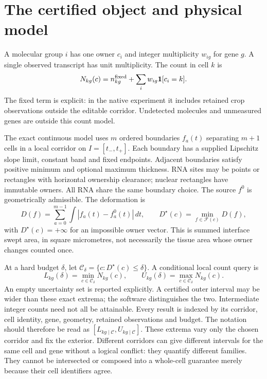 \documentclass[10pt,letterpaper]{article}
\newcommand{\F}{\mathcal F}
\newcommand{\C}{\mathcal C}
\newcommand{\D}{D^\star}
\newcommand{\ind}{\mathbf 1}
\begin{document}
\section{The certified object and physical model}
A molecular group \(i\) has one owner \(c_i\) and integer multiplicity \(w_{ig}\) for gene \(g\). A single observed transcript has unit multiplicity. The count in cell \(k\) is
\begin{equation}
 N_{kg}(c)=n^{\rm fixed}_{kg}+\sum_i w_{ig}\ind[c_i=k].\label{eq:count}
\end{equation}
The fixed term is explicit: in the native experiment it includes retained crop observations outside the editable corridor. Undetected molecules and unmeasured genes are outside this count model.

The exact continuous model uses \(m\) ordered boundaries \(f_a(t)\) separating \(m+1\) cells in a local corridor on $I=[t_-,t_+]$. Each boundary has a supplied Lipschitz slope limit, constant band and fixed endpoints. Adjacent boundaries satisfy positive minimum and optional maximum thickness. RNA sites may be points or rectangles with horizontal ownership clearance; nuclear rectangles have immutable owners. All RNA share the same boundary choice. The source \(f^0\) is geometrically admissible. The deformation is
\begin{equation}
 D(f)=\sum_{a=0}^{m-1}\int |f_a(t)-f^0_a(t)|\,dt,
 \qquad \D(c)=\min_{f\in\F(c)}D(f),\label{eq:area}
\end{equation}
with \(\D(c)=+\infty\) for an impossible owner vector. This is summed interface swept area, in square micrometres, not necessarily the tissue area whose owner changes counted once.

At a hard budget \(\delta\), let \(\C_\delta=\{c:\D(c)\leq\delta\}\). A conditional local count query is
\begin{equation}
 L_{kg}(\delta)=\min_{c\in\C_\delta}N_{kg}(c),\qquad
 U_{kg}(\delta)=\max_{c\in\C_\delta}N_{kg}(c).\label{eq:interval}
\end{equation}
An empty uncertainty set is reported explicitly. A certified outer interval may be wider than these exact extrema; the software distinguishes the two. Intermediate integer counts need not all be attainable. Every result is indexed by its corridor, cell identity, gene, geometry, retained observations and budget. The notation should therefore be read as $[L_{kg\mid\mathcal C},U_{kg\mid\mathcal C}]$. These extrema vary only the chosen corridor and fix the exterior. Different corridors can give different intervals for the same cell and gene without a logical conflict: they quantify different families. They cannot be intersected or composed into a whole-cell guarantee merely because their cell identifiers agree.
\end{document}
